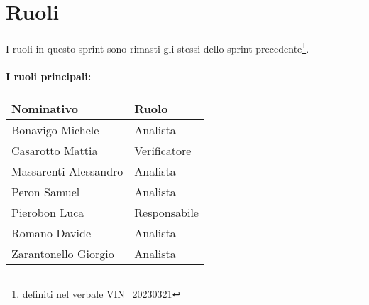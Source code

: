 \section{Ruoli}

I ruoli in questo sprint sono rimasti gli stessi dello sprint precedente\footnote{definiti nel verbale VIN\_20230321}.

\paragraph{I ruoli principali:}

\begin{center}
    \begin{tabularx}{\textwidth}{X l}

        \rowcolor{gray!30} \textbf{Nominativo} & \textbf{Ruolo}\\

        \hline

        Bonavigo Michele & Analista \\
        \rowcolor{gray!10}Casarotto Mattia & Verificatore \\
        Massarenti Alessandro & Analista \\
        \rowcolor{gray!10}Peron Samuel & Analista \\
        Pierobon Luca & Responsabile \\
        \rowcolor{gray!10}Romano Davide & Analista \\
        Zarantonello Giorgio & Analista \\

    \end{tabularx}
\end{center}